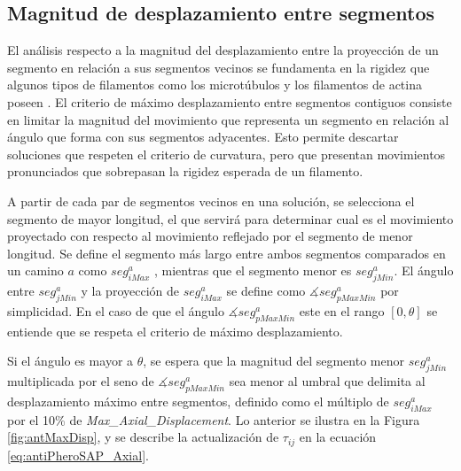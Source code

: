 \subsection{Magnitud de desplazamiento entre segmentos}
El an\'alisis respecto a la magnitud del desplazamiento entre la proyecci\'on de un segmento en relaci\'on a sus segmentos vecinos se fundamenta en la rigidez que algunos tipos de filamentos como los microt\'ubulos y los filamentos de actina poseen . El criterio de m\'aximo desplazamiento entre segmentos contiguos consiste en limitar la magnitud del movimiento que representa un segmento en relaci\'on al \'angulo que forma con sus segmentos adyacentes. Esto permite descartar soluciones que respeten el criterio de curvatura, pero que presentan movimientos pronunciados que sobrepasan la rigidez esperada de un filamento.

A partir de cada par de segmentos vecinos en una soluci\'on, se  selecciona el segmento de mayor longitud, el que servir\'a para determinar cual es el movimiento proyectado con respecto al movimiento reflejado por el segmento de menor longitud. Se define el segmento m\'as largo entre ambos segmentos comparados en un camino $a$ como $seg^{a}_{iMax}$ , mientras que el segmento menor es $seg^{a}_{jMin}$. El \'angulo entre $seg^{a}_{jMin}$ y la proyecci\'on de $seg^{a}_{iMax}$ se define como 
$\measuredangle seg^{a}_{pMaxMin}$ por simplicidad. En el caso de que el \'angulo $\measuredangle seg^{a}_{pMaxMin}$ este en el rango $[0, \theta]$ se entiende que se respeta el criterio de m\'aximo desplazamiento.


Si el \'angulo es mayor a $\theta$, se espera que la magnitud del segmento menor $seg^{a}_{jMin}$ multiplicada por el seno de $\measuredangle seg^{a}_{pMaxMin}$ sea menor al umbral que delimita al desplazamiento m\'aximo entre segmentos, definido como el m\'ultiplo de $seg^{a}_{iMax}$ por el 10\% de {\it Max\_Axial\_Displacement}. Lo anterior se ilustra en la Figura \ref{fig:antMaxDisp}, y se describe la actualizaci\'on de $\tau_{ij}$ en la ecuaci\'on \ref{eq:antiPheroSAP_Axial}.


